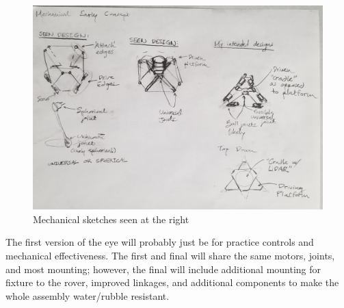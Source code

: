 \documentclass[a4paper, 10pt]{article}
\begin{document}
		\begin{figure}
			\centering
			\includegraphics[scale=0.2]{early_mechanical}
			\caption{Mechanical sketches seen at the right}
			\label{fig_1}
		\end{figure}
	
		The first version of the eye will probably just be for practice controls and mechanical effectiveness. The first and final will share the same motors, joints, and most mounting; however, the final will include additional mounting for fixture to the rover, improved linkages, and additional components to make the whole assembly water/rubble resistant. 
\end{document}

